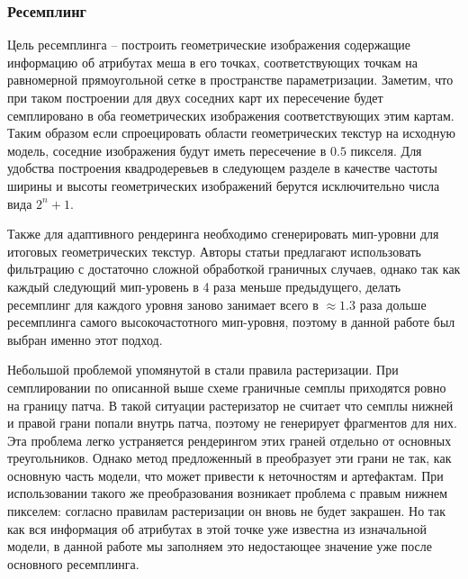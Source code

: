 \documentclass[12pt]{extarticle}
\begin{document}
\subsubsection{Ресемплинг}
Цель ресемплинга -- построить геометрические изображения содержащие информацию об атрибутах меша в его точках, соответствующих точкам на равномерной прямоугольной сетке в пространстве параметризации. Заметим, что при таком построении для двух соседних карт их пересечение будет семплировано в оба геометрических изображения соответствующих этим картам. Таким образом если спроецировать области геометрических текстур на исходную модель, соседние изображения будут иметь пересечение в $0.5$ пикселя. Для удобства построения квадродеревьев в следующем разделе в качестве частоты ширины и высоты геометрических изображений берутся исключительно числа вида $2^n + 1$.

Также для адаптивного рендеринга необходимо сгенерировать мип-уровни для итоговых геометрических текстур. Авторы статьи \cite{purnomo2004} предлагают использовать фильтрацию с достаточно сложной обработкой граничных случаев, однако так как каждый следующий мип-уровень в 4 раза меньше предыдущего, делать ресемплинг для каждого уровня заново занимает всего в $\approx1.3$ раза дольше ресемплинга самого высокочастотного мип-уровня, поэтому в данной работе был выбран именно этот подход.

Небольшой проблемой упомянутой в \cite{niski2007multi} стали правила растеризации. При семплировании по описанной выше схеме граничные семплы приходятся ровно на границу патча. В такой ситуации растеризатор не считает что семплы нижней и правой грани попали внутрь патча, поэтому не генерирует фрагментов для них. Эта проблема легко устраняется рендерингом этих граней отдельно от основных треугольников. Однако метод предложенный в \cite{niski2007multi} преобразует эти грани не так, как основную часть модели, что может привести к неточностям и артефактам. При использовании такого же преобразования возникает проблема с правым нижнем пикселем: согласно правилам растеризации он вновь не будет закрашен. Но так как вся информация об атрибутах в этой точке уже известна из изначальной модели, в данной работе мы заполняем это недостающее значение уже после основного ресемплинга.
\end{document}
